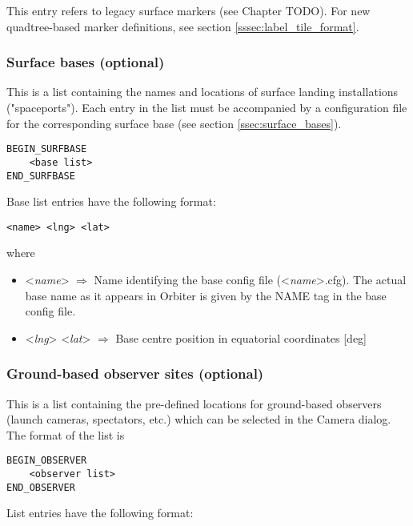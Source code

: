 \documentclass[Orbiter Developer Manual.tex]{subfiles}
\begin{document}
\noindent
This entry refers to legacy surface markers (see Chapter TODO). For new quadtree-based marker definitions, see section \ref{sssec:label_tile_format}.


\subsubsection*{Surface bases (optional)}
This is a list containing the names and locations of surface landing installations ("spaceports"). Each entry in the list must be accompanied by a configuration file for the corresponding surface base (see section \ref{ssec:surface_bases}).

\begin{lstlisting}[language=OSFS]
BEGIN_SURFBASE
	<base list>
END_SURFBASE
\end{lstlisting}

\noindent
Base list entries have the following format:

\begin{lstlisting}[language=OSFS]
<name> <lng> <lat>
\end{lstlisting}

\noindent
where

\begin{itemize}
\item <\textit{name}> $\Rightarrow$ Name identifying the base config file (<\textit{name}>.cfg). The actual base name as it appears in Orbiter is given by the NAME tag in the base config file.
\item <\textit{lng}> <\textit{lat}> $\Rightarrow$ Base centre position in equatorial coordinates [deg]
\end{itemize}


\subsubsection*{Ground-based observer sites (optional)}
This is a list containing the pre-defined locations for ground-based observers (launch cameras, spectators, etc.) which can be selected in the Camera dialog. The format of the list is

\begin{lstlisting}[language=OSFS]
BEGIN_OBSERVER
	<observer list>
END_OBSERVER
\end{lstlisting}

\noindent
List entries have the following format:
\end{document}
